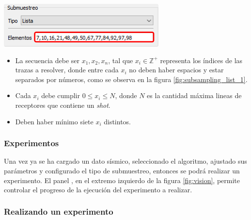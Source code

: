 \documentclass[12pt,twoside,letter]{ol-softwaremanual}
\newcommand*\circled[1]{\tikz[baseline=(char.base)]{
            \node[shape=circle,draw,inner sep=2pt] (char) {#1};}}
\newenvironment{Figure}
  {\par\medskip\noindent\minipage{\linewidth}}
  {\endminipage\par\medskip}
\begin{document}
\begin{multicols}{2}

\begin{Figure}
	\vspace{5mm}
	\centering
	\includegraphics[width=1\linewidth]{subsampling-list-1.png}
	\label{fig:subsampling_list_1}
\end{Figure}

\begin{itemize}
	\setlength\itemsep{0em}
    \item La secuencia debe ser $x_1,x_2,x_n$, tal que $x_i \in \mathbb{Z}^+$ representa los índices de las trazas a resolver, donde entre cada $x_i$ no deben haber espacios y estar separados por números, como se observa en la figura \ref{fig:subsampling_list_1}.
    \item Cada $x_i$ debe cumplir $0 \leq x_i \leq N$, donde $N$ es la cantidad máxima lineas de receptores que contiene un \emph{shot}.
    \item Deben haber mínimo siete $x_i$ distintos.
\end{itemize}

\end{multicols}

\subsubsection{Experimentos}
\label{sec:experiment}

Una vez ya se ha cargado un dato sísmico, seleccionado el algoritmo, ajustado sus parámetros y configurado el tipo de submuestreo, entonces se podrá realizar un experimento. El panel \circled{5}, en el extremo izquierdo de la figura \ref{fig:vision}, permite controlar el progreso de la ejecución del experimento a realizar.

\subsubsection*{Realizando un experimento}
\end{document}

